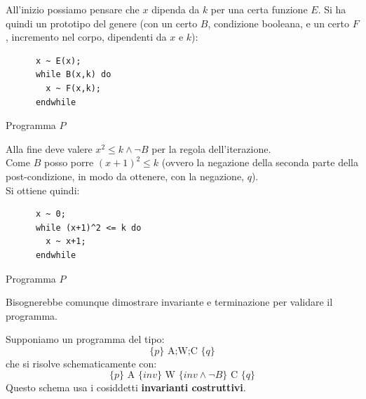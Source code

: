 \begin{esempio}
				      					      				All'inizio possiamo pensare che $x$ dipenda da $k$ per una certa funzione $E$.
				      					      				Si ha quindi un prototipo del genere (con un certo $B$, condizione booleana, e
				      					      				un certo $F$, incremento nel corpo, dipendenti da $x$ e $k$):
				      					      				\begin{listing}[H]
				      					      					\begin{lstlisting}
      x ~ E(x);
      while B(x,k) do
        x ~ F(x,k);
      endwhile  
				      					      					\end{lstlisting}
				      					      					\caption{Programma $P$}
				      					      				\end{listing}
				      					      				Alla fine deve valere $x^2\leq k \land \neg B$ per la regola
				      					      				dell'iterazione.\\
				      					      				Come $B$ posso porre $(x+1)^2\leq k$ (ovvero la negazione della seconda parte
				      					      				della post-condizione, in modo da ottenere, con la negazione, $q$).\\ Si
				      					      				ottiene quindi: 
				      					      				\begin{listing}[H]
				      					      					\begin{lstlisting}
      x ~ 0;
      while (x+1)^2 <= k do
        x ~ x+1;
      endwhile  
				      					      					\end{lstlisting}
				      					      					\caption{Programma $P$}
				      					      				\end{listing}
				      					      				Bisognerebbe comunque dimostrare invariante e terminazione per validare il
				      					      				programma. 
				      					      			\end{esempio}
				      					      			Supponiamo un programma del tipo:
				      					      			\[\{p\}\mbox{ A;W;C } \{q\}\]
				      					      			che si risolve schematicamente con:
				      					      			\[\{p\}\mbox{ A } \{inv\} \mbox{ W } \{inv\land \neg B\}\mbox{ C }\{q\}\]
				      					      			Questo schema usa i cosiddetti \textbf{invarianti costruttivi}.\\
